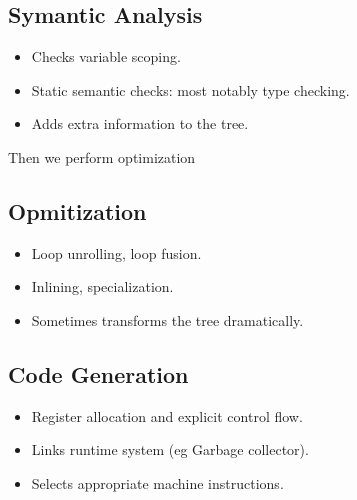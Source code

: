 \subsection{Symantic Analysis}
\begin{itemize}
  \item Checks variable scoping.
  \item Static semantic checks: most notably type checking.
  \item Adds extra information to the tree.
\end{itemize}

Then we perform optimization
\subsection{Opmitization}
\begin{itemize}
  \item Loop unrolling, loop fusion.
  \item Inlining, specialization.
  \item Sometimes transforms the tree dramatically.
\end{itemize}

\subsection{Code Generation}
\begin{itemize}
  \item Register allocation and explicit control flow.
  \item Links runtime system (eg Garbage collector).
  \item Selects appropriate machine instructions.
\end{itemize}

